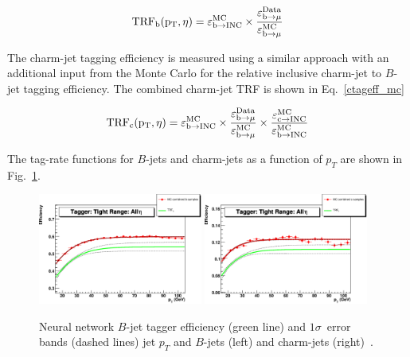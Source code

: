\begin{equation}
\label{btageff_mc}
\rm{TRF}_{b}(p_{T}, \eta) = \varepsilon_{b\rightarrow\rm{INC}}^{\rm{MC}} \times \frac{\varepsilon^{\rm{Data}}_{b\rightarrow\mu}}{\varepsilon^{\rm{MC}}_{b\rightarrow\mu}}
\end{equation}

The charm-jet tagging efficiency is measured using a similar approach with an additional input from the Monte Carlo for the relative inclusive charm-jet to $B$-jet tagging efficiency. The combined charm-jet TRF is shown in Eq.~\ref{ctageff_mc}

\begin{equation}
\label{ctageff_mc}
\rm{TRF}_{c}(p_{T}, \eta) = \varepsilon_{b\rightarrow\rm{INC}}^{\rm{MC}} \times \frac{\varepsilon^{\rm{Data}}_{b\rightarrow\mu}}{\varepsilon^{\rm{MC}}_{b\rightarrow\mu}} \times \frac{\varepsilon^{\rm{MC}}_{c\rightarrow\rm{INC}}}{\varepsilon^{\rm{MC}}_{b\rightarrow\rm{INC}}}
\end{equation}

The tag-rate functions for $B$-jets and charm-jets as a function of $p_{T}$ are shown in Fig.~\ref{bctrf}.

\begin{figure}[!h!tbp]
\begin{center}
\includegraphics[width=0.48\textwidth]{eps/Systematics/trf_b_0.775_pt.eps}
\includegraphics[width=0.48\textwidth]{eps/Systematics/trf_c_0.775_pt.eps}
\end{center}
\vspace{-0.1in}
\caption{Neural network $B$-jet tagger efficiency (green line) and $1\sigma$~error bands (dashed lines) jet $p_{T}$ and $B$-jets (left) and charm-jets (right)~\cite{bid}.}
\label{bctrf}
\end{figure}



